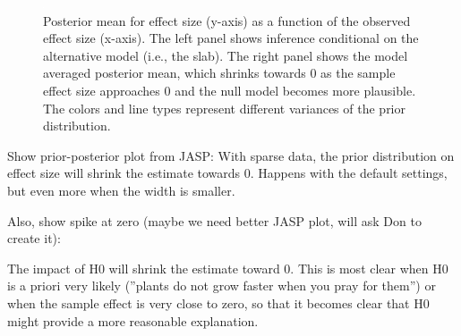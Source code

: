 \documentclass[a4paper]{article}
\begin{document}
\begin{figure}[!ht]
	\includegraphics[width=\textwidth]{posteriorMeanVsSampleDelta.pdf}
	\caption{Posterior mean for effect size (y-axis) as a function of the observed effect size (x-axis). The left panel shows inference conditional on the alternative model (i.e., the slab). The right panel shows the model averaged posterior mean, which shrinks towards 0 as the sample effect size approaches 0 and the null model becomes more plausible. The colors and line types represent different variances of the prior distribution.}
	\label{fig:posteriorMeanVsSampleDelta}
\end{figure}


Show prior-posterior plot from JASP:
With sparse data, the prior distribution on effect size will shrink the estimate towards 0. Happens with the default settings, but even more when the width is smaller.

Also, show spike at zero (maybe we need better JASP plot, will ask Don to create it):

The impact of H0 will shrink the estimate toward 0. This is most clear when H0 is a priori very likely (''plants do not grow faster when you pray for them'') or when the sample effect is very close to zero, so that it becomes clear that H0 might provide a more reasonable explanation.
\end{document}
